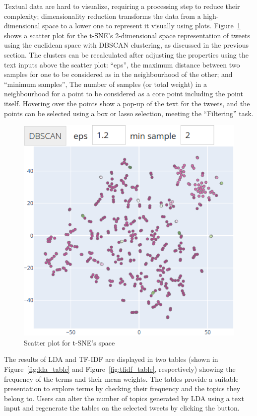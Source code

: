 Textual data are hard to visualize, requiring a processing step to reduce their complexity;
dimensionality reduction transforms the data from a high-dimensional space to a lower one to
represent it visually using plots. Figure~\ref{fig:scatter} shows a scatter plot for the
\ac{t-SNE}'s 2-dimensional space representation of tweets using the euclidean space with \ac{DBSCAN}
clustering, as discussed in the previous section. The clusters can be recalculated after adjusting
the properties using the text inputs above the scatter plot: ``eps'', the maximum distance between
two samples for one to be considered as in the neighbourhood of the other; and ``minimum samples'',
The number of samples (or total weight) in a neighbourhood for a point to be considered as a core
point including the point itself. Hovering over the points show a pop-up of the text for the tweets,
and the points can be selected using a box or lasso selection, meeting the ``Filtering'' task.

\begin{figure}[H]
\begin{center}
  \includegraphics[width=0.5\columnwidth]{./images/scatter.png}
\end{center}
\caption{Scatter plot for t-SNE's space}
\label{fig:scatter}
\end{figure}

The results of \ac{LDA} and \ac{TF-IDF} are displayed in two tables (shown in
Figure~\ref{fig:lda_table} and Figure~\ref{fig:tfidf_table}, respectively)  showing the frequency of
the terms and their mean weights. The tables provide a suitable presentation to explore terms by
checking their frequency and the topics they belong to. Users can alter the number of topics
generated by \ac{LDA} using a text input and regenerate the tables on the selected tweets by
clicking the button. 

